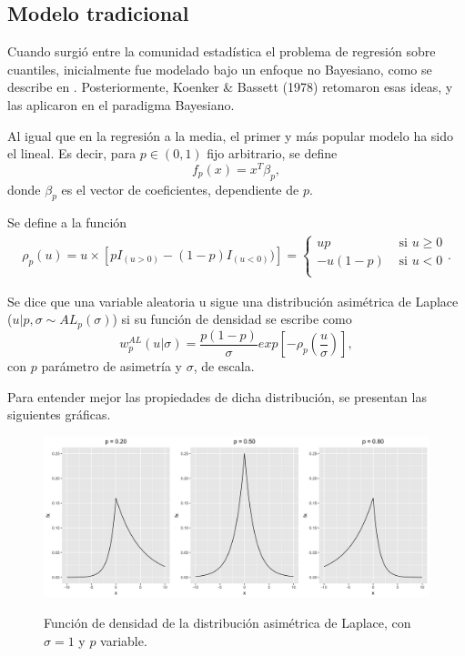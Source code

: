 \subsection{Modelo tradicional}

Cuando surgi\'o entre la comunidad estad\'istica el problema de regresi\'on sobre cuantiles, inicialmente fue modelado bajo un enfoque no Bayesiano, como se describe en \cite{Yu_BayQuantReg}.  Posteriormente, Koenker \& Bassett (1978) retomaron esas ideas, y las aplicaron en el paradigma Bayesiano. 

Al igual que en la regresi\'on a la media, el primer y m\'as popular modelo ha sido el lineal. Es decir, para $p \in (0,1)$ fijo arbitrario, se define
\begin{equation*}
    f_p(x) = x^T\beta_p, 
\end{equation*}
donde $\beta_p$ es el vector de coeficientes, dependiente de $p$.

\begin{defin}
    Se define a la funci\'on
    \begin{equation*}
    \begin{aligned}
        \rho_p(u) = u \times [pI_{(u>0)} - (1-p) I_{(u<0)})]
        =
        \begin{cases}
            up &\text{ si } u\geq0 \\
            -u(1-p) &\text{ si } u<0 \\
        \end{cases}
        .
    \end{aligned}
    \end{equation*}

    Se dice que una variable aleatoria u sigue una distribuci\'on asim\'etrica de Laplace ($u|p,\sigma \sim AL_p(\sigma)$) si su funci\'on de densidad se escribe como
    \begin{equation*}
        w_p^{AL}(u|\sigma) = 
        \frac{p(1-p)}{\sigma}
        exp\left[
        -\rho_p
        \left(
        \frac{u}{\sigma}
        \right)
        \right],
    \end{equation*}
con $p$ par\'ametro de asimetr\'ia y $\sigma$, de escala.
\end{defin}

Para entender mejor las propiedades de dicha distribuci\'on, se presentan las siguientes gr\'aficas.
\begin{figure}[H]
	\centering
	\caption{Funci\'on de densidad de la distribuci\'on asim\'etrica de Laplace, con $\sigma = 1$ y $p$ variable.}
	\includegraphics[width=1\textwidth]{Figures/ALD/p_plots.png}
	\label{p_plots}
\end{figure}

